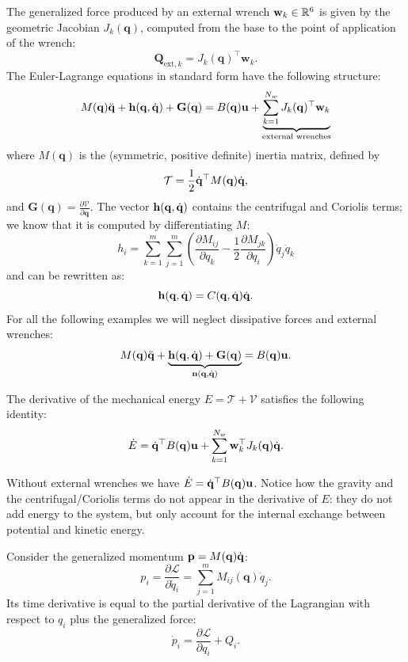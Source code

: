 \documentclass[10pt, a4paper]{report}
\newcommand{\q}{{\mathbf q}}
\begin{document}
The generalized force produced by an external wrench $\mathbf w_k\in {\mathbb R}^6$ is given by the geometric Jacobian $J_k(\q)$, computed from the base to the point of application of the wrench:\begin{equation}
     \boxed{\mathbf Q_{\text{ext},k}=J_k(\q)^\top\mathbf w_k}.
\end{equation}
The Euler-Lagrange equations in standard form have the following structure:\begin{equation}
    M(\q)\ddq+\mathbf h(\q,\dq)+\mathbf G(\q)=B(\q)\mathbf u+\underbrace{\sum_{k=1}^{N_w}J_k(\q)^\top\mathbf w_k}_{\text{external wrenches}}
\end{equation}
where $M(\q)$ is the (symmetric, positive definite) inertia matrix, defined by\begin{equation}
\mathcal T = \frac{1}{2}\dq^\top M(\q)\dq,
\end{equation}and $\mathbf G(\q)=\frac{\partial \mathcal V}{\partial \q}$. The vector $\mathbf h(\q,\dq)$ contains the centrifugal and Coriolis terms; we know that it is computed by differentiating $M$:\begin{equation}
    h_i=\sum_{k=1}^{m}\sum_{j=1}^{m}\left(\frac{\partial M_{ij}}{\partial q_k}-\frac{1}{2}\frac{\partial M_{jk}}{\partial q_i}\right)\dot q_j\dot q_k
\end{equation}
and can be rewritten as:\begin{equation}
    \mathbf h(\q,\dq)=C(\q,\dq)\dq.
\end{equation}
For all the following examples we will neglect dissipative forces and external wrenches:\begin{equation}
      M(\q)\ddq+\underbrace{\mathbf h(\q,\dq)+\mathbf G(\q)}_{\mathbf n(\q,\dq)}=B(\q)\mathbf u.
\end{equation}
\begin{boxproposition}{}{}
    The derivative of the mechanical energy $E=\mathcal T+\mathcal V$ satisfies the following identity:\begin{equation}
        \dot E = \dq^\top B(\q)\mathbf u+\sum_{k=1}^{N_w}\mathbf w_k^\top J_k(\q)\dq.
    \end{equation}
\end{boxproposition}
\noindent Without external wrenches we have $ \dot E = \dq^\top B(\q)\mathbf u$. Notice how the gravity and the centrifugal/Coriolis terms do not appear in the derivative of $E$: they do not add energy to the system, but only account for the internal exchange between potential and kinetic energy.
\begin{boxproposition}{}{}
    Consider the generalized momentum $\mathbf p = M(\q)\dq$:\begin{equation}
        p_i=\frac{\partial \mathcal L}{\partial\dot q_i}=\sum_{j=1}^{m}M_{ij}(\q)\dot q_j.
    \end{equation} 
    Its time derivative is equal to the partial derivative of the Lagrangian with respect to $q_i$ plus the generalized force:\begin{equation}
        \dot p_i=\frac{\partial\mathcal L}{\partial q_i}+Q_i.
    \end{equation}
\end{boxproposition}
\end{document}
